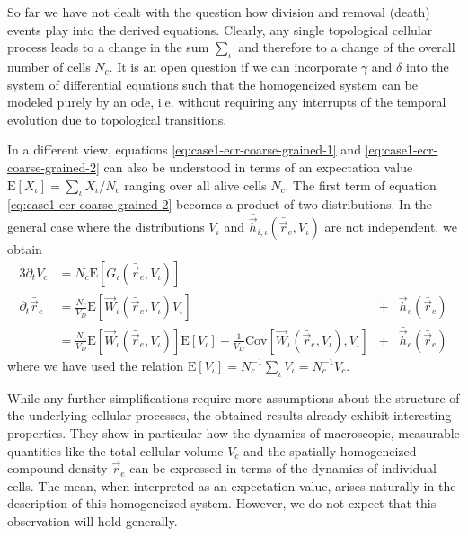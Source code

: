 So far we have not dealt with the question how division and removal (death) events play into the
derived equations.
Clearly, any single topological cellular process leads to a change in the sum $\sum_\iota$ and
therefore to a change of the overall number of cells $N_c$.
It is an open question if we can incorporate $\gamma$ and $\delta$ into the system of differential
equations such that the homogeneized system can be modeled purely by an \ac{ode}, i.e. without
requiring any interrupts of the temporal evolution due to topological transitions.

In a different view, equations \eqref{eq:case1-ecr-coarse-grained-1} and
\eqref{eq:case1-ecr-coarse-grained-2} can also be understood in terms of an expectation value
$\text{E}[X_\iota]=\sum_\iota X_\iota/N_c$ ranging over all alive cells $N_c$.
The first term of equation \eqref{eq:case1-ecr-coarse-grained-2} becomes a product of two
distributions.
In the general case where the distributions $V_\iota$ and
$\bar{\vec{h}}_{i,\iota}(\bar{\vec{r}}_e,V_\iota)$ are not independent, we obtain
\begin{alignat}{3}
    \partial_t V_c &= N_c\text{E}[G_\iota(\bar{\vec{r}}_e,V_\iota)]
    \label{eq:case1-ev-volume}\\
    \partial_t\bar{\vec{r}}_e
        &= \frac{N_c}{V_D} \text{E}[\vec{W}_\iota(\bar{\vec{r}}_e,V_\iota)V_\iota]
        &+& \bar{\vec{h}}_e(\bar{\vec{r}}_e)
    \label{eq:case1-ev-reactions}\\
        &= \frac{N_c}{V_D}\text{E}[\vec{W}_\iota(\bar{\vec{r}}_e,V_\iota)]\text{E}[V_\iota]
        + \frac{1}{V_D}\text{Cov}[\vec{W}_\iota(\bar{\vec{r}}_e,V_\iota),V_\iota]
        &+& \bar{\vec{h}}_e(\bar{\vec{r}}_e)
\end{alignat}
where we have used the relation $\text{E}[V_\iota]=N_c^{-1}\sum_\iota V_\iota=N_c^{-1}V_c$.

While any further simplifications require more assumptions about the structure of the underlying
cellular processes, the obtained results already exhibit interesting properties.
They show in particular how the dynamics of macroscopic, measurable quantities like the total
cellular volume $V_c$ and the spatially homogeneized compound density $\vec{r}_e$ can be expressed
in terms of the dynamics of individual cells.
The mean, when interpreted as an expectation value, arises naturally in the description of this
homogeneized system.
However, we do not expect that this observation will hold generally.

